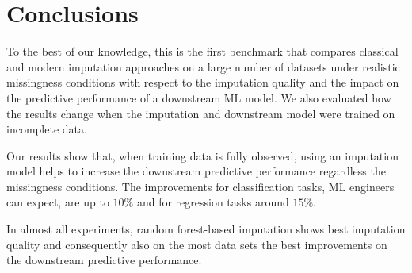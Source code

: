 \section{Conclusions}
\label{sec:conclusion}
%
To the best of our knowledge, this is the first benchmark that compares classical and modern imputation approaches on a large number of datasets under realistic missingness conditions with respect to the imputation quality and the impact on the predictive performance of a downstream ML model. We also evaluated how the results change when the imputation and downstream model were trained on incomplete data.

Our results show that, when training data is fully observed, using an imputation model helps to increase the downstream predictive performance regardless the missingness conditions. The improvements for classification tasks, ML engineers can expect, are up to $10\%$ and for regression tasks around $15\%$.

In almost all experiments, random forest-based imputation shows best imputation quality and consequently also on the most data sets the best improvements on the downstream predictive performance.
